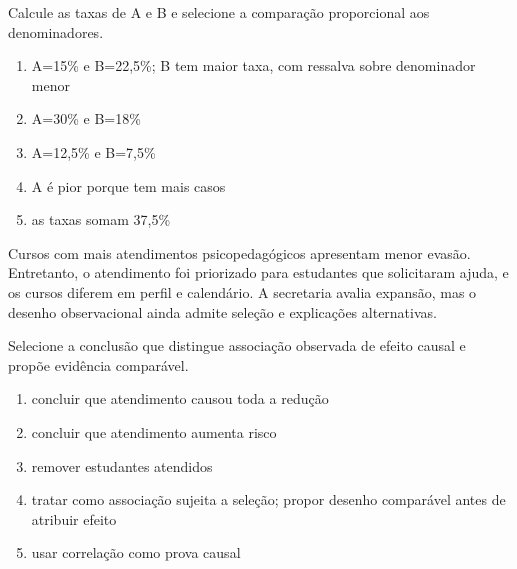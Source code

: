 \FonteDidatica

\Comando Calcule as taxas de A e B e selecione a comparação proporcional aos denominadores.

\begin{enumerate}[label=\Alph*)]

\item A=15\% e B=22,5\%; B tem maior taxa, com ressalva sobre denominador menor

\item A=30\% e B=18\%

\item A=12,5\% e B=7,5\%

\item A é pior porque tem mais casos

\item as taxas somam 37,5\%

\end{enumerate}


\TextoBase

Cursos com mais atendimentos psicopedagógicos apresentam menor evasão. Entretanto, o atendimento foi priorizado para estudantes que solicitaram ajuda, e os cursos diferem em perfil e calendário. A secretaria avalia expansão, mas o desenho observacional ainda admite seleção e explicações alternativas.

\FonteDidatica

\Comando Selecione a conclusão que distingue associação observada de efeito causal e propõe evidência comparável.

\begin{enumerate}[label=\Alph*)]

\item concluir que atendimento causou toda a redução

\item concluir que atendimento aumenta risco

\item remover estudantes atendidos

\item tratar como associação sujeita a seleção; propor desenho comparável antes de atribuir efeito

\item usar correlação como prova causal

\end{enumerate}

